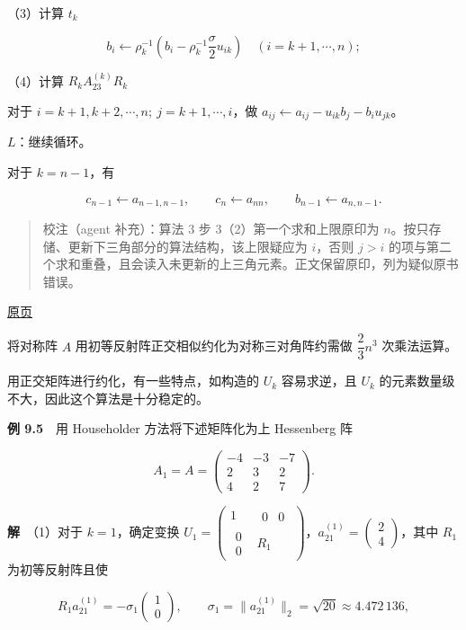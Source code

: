 \documentclass[
  10pt,
  fontset=fandol]{ctexart}
\begin{document}
（3）计算 \(t_k\)

\[
b_i\leftarrow\rho_k^{-1}\left(b_i-\rho_k^{-1}\frac\sigma2u_{ik}\right)
\quad(i=k+1,\cdots,n);
\]

（4）计算 \(R_kA_{23}^{(k)}R_k\)

对于 \(i=k+1,\allowbreak k+2,\allowbreak \cdots,\allowbreak n;\ j=k+1,\allowbreak \cdots,\allowbreak i\)，做 \(a_{ij}\leftarrow a_{ij}-u_{ik}b_j-b_iu_{jk}\)。

\(L\)：继续循环。

对于 \(k=n-1\)，有

\[
c_{n-1}\leftarrow a_{n-1,n-1},\qquad c_n\leftarrow a_{nn},\qquad b_{n-1}\leftarrow a_{n,n-1}.
\]

\begin{quote}
校注（agent 补充）：算法 3 步 3（2）第一个求和上限原印为 \(n\)。按只存储、更新下三角部分的算法结构，该上限疑应为 \(i\)，否则 \(j>i\) 的项与第二个求和重叠，且会读入未更新的上三角元素。正文保留原印，列为疑似原书错误。
\end{quote}

\href{../../source-images/pdf-249.jpeg}{原页}

将对称阵 \(A\) 用初等反射阵正交相似约化为对称三对角阵约需做 \(\dfrac23n^3\) 次乘法运算。

用正交矩阵进行约化，有一些特点，如构造的 \(U_k\) 容易求逆，且 \(U_k\) 的元素数量级不大，因此这个算法是十分稳定的。

\textbf{例 9.5}　用 Householder 方法将下述矩阵化为上 Hessenberg 阵

\[
A_1=A=\begin{pmatrix}-4&-3&-7\\2&3&2\\4&2&7\end{pmatrix}.
\]

\textbf{解}　（1）对于 \(k=1\)，确定变换 \(U_1=\begin{pmatrix}1&\begin{matrix}0&0\end{matrix}\\\begin{matrix}0\\0\end{matrix}&R_1\end{pmatrix}\)，\(a_{21}^{(1)}=\begin{pmatrix}2\\4\end{pmatrix}\)，其中 \(R_1\) 为初等反射阵且使

\[
R_1a_{21}^{(1)}=-\sigma_1\begin{pmatrix}1\\0\end{pmatrix},\qquad
\sigma_1=\|a_{21}^{(1)}\|_2=\sqrt{20}\approx4.472\,136,
\]
\end{document}
